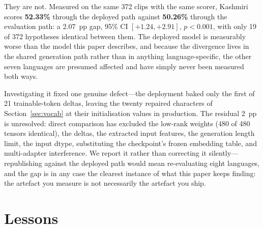 \documentclass[sigconf,anonymous,review]{acmart}
\begin{document}
They are not. Measured on the same 372 clips with the same scorer, Kashmiri
scores \textbf{52.33\%} through the deployed path against \textbf{50.26\%}
through the evaluation path: a 2.07~pp gap, 95\% CI $[+1.24, +2.91]$,
$p<0.001$, with only 19 of 372 hypotheses identical between them. The deployed
model is measurably worse than the model this paper describes, and because the
divergence lives in the shared generation path rather than in anything
language-specific, the other seven languages are presumed affected and have
simply never been measured both ways.

Investigating it fixed one genuine defect---the deployment baked only the first
of 21 trainable-token deltas, leaving the twenty repaired characters of
Section~\ref{sec:vocab} at their initialisation values in production. The
residual 2~pp is unresolved: direct comparison has excluded the low-rank weights
(480 of 480 tensors identical), the deltas, the extracted input features, the
generation length limit, the input dtype, substituting the checkpoint's frozen
embedding table, and multi-adapter interference. We report it rather than
correcting it silently---republishing against the deployed path would mean
re-evaluating eight languages, and the gap is in any case the clearest instance
of what this paper keeps finding: the artefact you measure is not necessarily
the artefact you ship.

\section{Lessons}
\label{sec:lessons}
\end{document}
